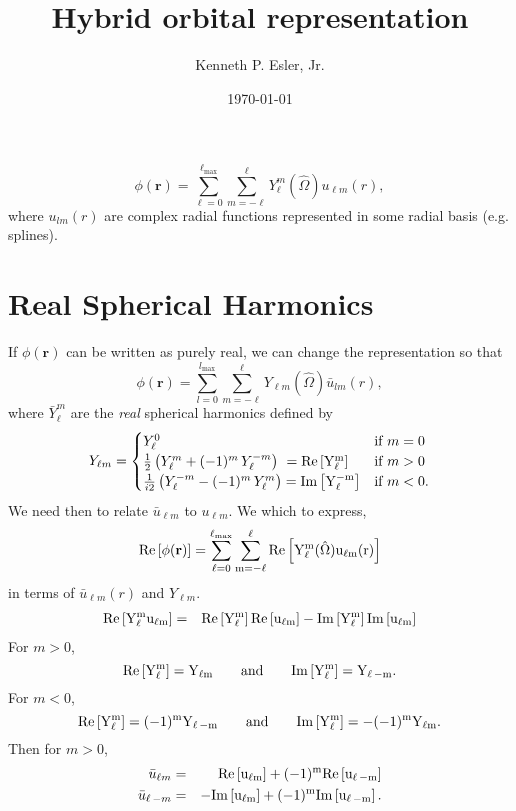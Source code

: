 \documentclass{article}
\author{Kenneth P. Esler, Jr.}
\title{Hybrid orbital representation}
\date{\today}
\begin{document}
\newcommand{\vr}{\mathbf{r}}
\maketitle
\begin{equation}
\phi(\vr) = \sum_{\ell=0}^{\ell_\text{max}} \sum_{m=-\ell}^\ell Y_\ell^m (\hat{\Omega})
u_{\ell m}(r),
\end{equation}
where $u_{lm}(r)$ are complex radial functions represented in some
radial basis (e.g. splines).

\section{Real Spherical Harmonics}
\renewcommand{\Re}{\rm Re}
\renewcommand{\Im}{\rm Im}
If $\phi(\vr)$ can be written as purely real, we can change the
representation so that
\begin{equation}
\phi(\vr) = \sum_{l=0}^{l_\text{max}} \sum_{m=-\ell}^\ell Y_{\ell m}(\hat{\Omega})
\bar{u}_{lm}(r),
\end{equation}
where $\bar{Y}_\ell^m$ are the {\em real} spherical harmonics defined by
\begin{equation}
Y_{\ell m} = \begin{cases}
Y_\ell^0 & \mbox{if } m=0\\
{1\over 2}\left(Y_\ell^m+(-1)^m \, Y_\ell^{-m}\right) \ = \Re\left[Y_\ell^m\right]
& \mbox{if } m>0 \\
{1\over i 2}\left(Y_\ell^{-m}-(-1)^{m}\, Y_\ell^{m}\right) = \Im\left[Y_\ell^{-m}\right]
&\mbox{if } m<0.
\end{cases}
\end{equation}
We need then to relate $\bar{u}_{\ell m}$ to $u_{\ell m}$.  We which
to express,
\begin{equation}
\Re\left[\phi(\vr)\right] = \sum_{\ell=0}^{\ell_\text{max}} \sum_{m=-\ell}^\ell
\Re\left[Y_\ell^m (\hat{\Omega}) u_{\ell m}(r)\right]
\end{equation}
in terms of $\bar{u}_{\ell m}(r)$ and $Y_{\ell m}$.
\begin{eqnarray}
\Re\left[Y_\ell^m u_{\ell m}\right] & = & \Re\left[Y_\ell^m\right]
\Re\left[u_{\ell m}\right] - \Im\left[Y_\ell^m\right] \Im\left[u_{\ell m}\right]
\end{eqnarray}
For $m>0$,
\begin{equation}
\Re\left[Y_\ell^m\right] = Y_{\ell m} \qquad \text{and} \qquad \Im\left[Y_\ell^m\right] = Y_{\ell\,-m}.
\end{equation}
For $m<0$,
\begin{equation}
\Re\left[Y_\ell^m\right] = (-1)^m Y_{\ell\, -m} \qquad \text and \qquad \Im\left[Y_\ell^m\right] = -(-1)^m Y_{\ell m}.
\end{equation}
Then for $m > 0$,
\begin{eqnarray}
\bar{u}_{\ell m} & = & \Re\left[u_{\ell m}\right] + (-1)^m \Re\left[u_{\ell\,-m}\right] \\
\bar{u}_{\ell\, -m} & = & -\Im\left[u_{\ell m}\right] + (-1)^m \Im\left[u_{\ell\,-m}\right].
\end{eqnarray}
\end{document}
